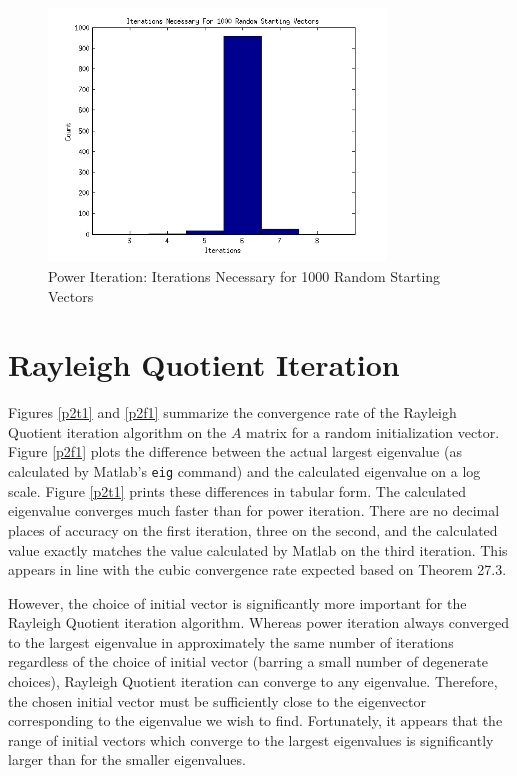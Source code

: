 \documentclass{article}
\begin{document}
\begin{figure}
\centering
\includegraphics[width=0.8\textwidth]{Problem1Figure3.png}
\caption{Power Iteration: Iterations Necessary for 1000 Random Starting Vectors}
\label{p1f3}
\end{figure}

\section{Rayleigh Quotient Iteration}\label{p2}

Figures \ref{p2t1} and \ref{p2f1} summarize the convergence rate of the Rayleigh Quotient iteration algorithm on the \(A\) matrix for a random initialization vector. Figure \ref{p2f1} plots the difference between the actual largest eigenvalue (as calculated by Matlab's \verb|eig| command) and the calculated eigenvalue on a log scale. Figure \ref{p2t1} prints these differences in tabular form. The calculated eigenvalue converges much faster than for power iteration. There are no decimal places of accuracy on the first iteration, three on the second, and the calculated value exactly matches the value calculated by Matlab on the third iteration. This appears in line with the cubic convergence rate expected based on Theorem 27.3.

However, the choice of initial vector is significantly more important for the Rayleigh Quotient iteration algorithm. Whereas power iteration always converged to the largest eigenvalue in approximately the same number of iterations regardless of the choice of initial vector (barring a small number of degenerate choices), Rayleigh Quotient iteration can converge to any eigenvalue. Therefore, the chosen initial vector must be sufficiently close to the eigenvector corresponding to the eigenvalue we wish to find. Fortunately, it appears that the range of initial vectors which converge to the largest eigenvalues is significantly larger than for the smaller eigenvalues.
\end{document}
